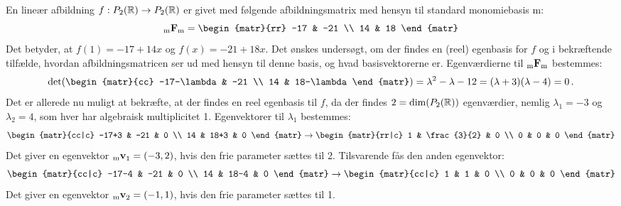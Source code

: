 \begin{example}
En lineær afbildning $ f: P_2(\mathbb{R}) \rightarrow P_2(\mathbb{R}) $ er givet med følgende afbildningsmatrix med hensyn til standard monomiebasis m:
\begin{equation}
\matind mFm = \begin{matr}{rr} -17 & -21 \\ 14 & 18 \end{matr}
\end{equation}
Det betyder, at $ f(1) = -17 + 14x $ og $ f(x) = -21 + 18x $. Det ønskes undersøgt, om der findes en (reel) egenbasis for $ f $ og i bekræftende tilfælde, hvordan afbildningsmatricen ser ud med hensyn til denne basis, og hvad basisvektorerne er. \bs
Egenværdierne til $ {_\mathrm{m}\mathbf{F}_\mathrm{m}} $ bestemmes:
\begin{equation}
\det\!\left(\begin{matr}{cc} -17-\lambda & -21 \\ 14 & 18-\lambda \end{matr}\right) = \lambda^2-\lambda-12 = (\lambda+3)(\lambda-4) = 0\,.
\end{equation}
Det er allerede nu muligt at bekræfte, at der findes en reel egenbasis til $ f $, da der findes $ 2 = \dim(P_2(\mathbb{R})) $ egenværdier, nemlig $ \lambda_1 = -3 $ og $ \lambda_2 = 4 $, som hver har algebraisk multiplicitet 1. Egenvektorer til $ \lambda_1 $ bestemmes:
\begin{equation}
\begin{matr}{cc|c} -17+3 & -21 & 0 \\ 14 & 18+3 & 0 \end{matr} \rightarrow \begin{matr}{rr|c} 1 & \frac{3}{2} & 0 \\ 0 & 0 & 0 \end{matr}
\end{equation}
Det giver en egenvektor $ {_\mathrm{m}\mathbf{v}}_1 = (-3,2) $, hvis den frie parameter sættes til 2. Tilsvarende fås den anden egenvektor:
\begin{equation}
\begin{matr}{cc|c} -17-4 & -21 & 0 \\ 14 & 18-4 & 0 \end{matr} \rightarrow \begin{matr}{cc|c} 1 & 1 & 0 \\ 0 & 0 & 0 \end{matr}
\end{equation}
Det giver en egenvektor $ {_\mathrm{m}\mathbf{v}}_2 = (-1,1) $, hvis den frie parameter sættes til 1. \bs

\end{example}
